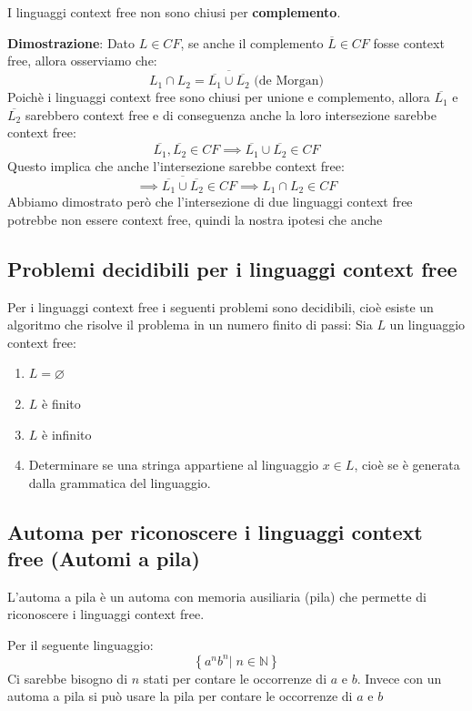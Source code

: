 \documentclass[a4paper]{article}
\begin{document}
\begin{theorem}
  I linguaggi context free non sono chiusi per \textbf{complemento}.

  \vspace{1em}
  \noindent
  \textbf{Dimostrazione}: Dato \( L \in CF \), se anche il complemento
  \( \overline{L} \in CF \) fosse context free, allora osserviamo che:
  \[
    L_1 \cap L_2 = \overline{\overline{L_1} \cup \overline{L_2}} \text{ (de Morgan)}
  \] 
  Poichè i linguaggi context free sono chiusi per unione e complemento,
  allora \( \overline{L_1} \) e \( \overline{L_2} \) sarebbero context free e di
  conseguenza anche la loro intersezione sarebbe context free:
  \[
    \overline{L_1}, \overline{L_2} \in CF \implies \overline{L_1} \cup \overline{L_2} \in CF
  \] 
  Questo implica che anche l'intersezione sarebbe context free:
  \[
    \implies \overline{\overline{L_1} \cup \overline{L_2}} \in CF \implies L_1 \cap L_2 \in CF
  \] 
  Abbiamo dimostrato però che l'intersezione di due linguaggi context free
  potrebbe non essere context free, quindi la nostra ipotesi che anche
\end{theorem}

\subsection{Problemi decidibili per i linguaggi context free}
Per i linguaggi context free i seguenti problemi sono decidibili, cioè esiste
un algoritmo che risolve il problema in un numero finito di passi:
Sia \( L \) un linguaggio context free:
\begin{enumerate}
  \item \( L = \varnothing \) 
  \item \( L \) è finito
  \item \( L \) è infinito
  \item Determinare se una stringa appartiene al linguaggio \( x \in L\), cioè se è
    generata dalla grammatica del linguaggio.
\end{enumerate}

\subsection{Automa per riconoscere i linguaggi context free (Automi a pila)}
L'automa a pila è un automa con memoria ausiliaria (pila) che permette di riconoscere i
linguaggi context free.
\begin{example}
  Per il seguente linguaggio:
  \[
    \left\{ a^n b^n \left|\; n \in \mathbb{N} \right. \right\}
  \] 
  Ci sarebbe bisogno di \( n \) stati per contare le occorrenze di \( a \) e
  \( b \). Invece con un automa a pila si può usare la pila per contare le occorrenze
  di \( a \) e \( b \)
\end{example}
\end{document}
